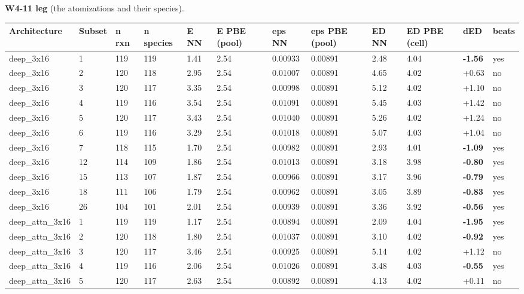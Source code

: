 \documentclass[10pt,a4paper]{article}
\begin{document}
\begin{landscape}
\textbf{W4-11 leg} (the atomizations and their species).

\begin{footnotesize}
\begin{longtable}{llllllllllll}
\toprule Architecture & Subset & n rxn & n species & E NN & E PBE (pool) & eps NN & eps PBE (pool) & ED NN & ED PBE (cell) & dED & beats \\ \midrule \endhead
deep\_3x16 & 1 & 119 & 119 & 1.41 & 2.54 & 0.00933 & 0.00891 & 2.48 & 4.04 & \textbf{-1.56} & yes \\
deep\_3x16 & 2 & 120 & 118 & 2.95 & 2.54 & 0.01007 & 0.00891 & 4.65 & 4.02 & +0.63 & no \\
deep\_3x16 & 3 & 120 & 117 & 3.35 & 2.54 & 0.00998 & 0.00891 & 5.12 & 4.02 & +1.10 & no \\
deep\_3x16 & 4 & 119 & 116 & 3.54 & 2.54 & 0.01091 & 0.00891 & 5.45 & 4.03 & +1.42 & no \\
deep\_3x16 & 5 & 120 & 117 & 3.43 & 2.54 & 0.01040 & 0.00891 & 5.26 & 4.02 & +1.24 & no \\
deep\_3x16 & 6 & 119 & 116 & 3.29 & 2.54 & 0.01018 & 0.00891 & 5.07 & 4.03 & +1.04 & no \\
deep\_3x16 & 7 & 118 & 115 & 1.70 & 2.54 & 0.00982 & 0.00891 & 2.93 & 4.01 & \textbf{-1.09} & yes \\
deep\_3x16 & 12 & 114 & 109 & 1.86 & 2.54 & 0.01013 & 0.00891 & 3.18 & 3.98 & \textbf{-0.80} & yes \\
deep\_3x16 & 15 & 113 & 107 & 1.87 & 2.54 & 0.00966 & 0.00891 & 3.17 & 3.96 & \textbf{-0.79} & yes \\
deep\_3x16 & 18 & 111 & 106 & 1.79 & 2.54 & 0.00962 & 0.00891 & 3.05 & 3.89 & \textbf{-0.83} & yes \\
deep\_3x16 & 26 & 104 & 101 & 2.01 & 2.54 & 0.00939 & 0.00891 & 3.36 & 3.92 & \textbf{-0.56} & yes \\
deep\_attn\_3x16 & 1 & 119 & 119 & 1.17 & 2.54 & 0.00894 & 0.00891 & 2.09 & 4.04 & \textbf{-1.95} & yes \\
deep\_attn\_3x16 & 2 & 120 & 118 & 1.80 & 2.54 & 0.01037 & 0.00891 & 3.10 & 4.02 & \textbf{-0.92} & yes \\
deep\_attn\_3x16 & 3 & 120 & 117 & 3.46 & 2.54 & 0.00925 & 0.00891 & 5.14 & 4.02 & +1.12 & no \\
deep\_attn\_3x16 & 4 & 119 & 116 & 2.06 & 2.54 & 0.01026 & 0.00891 & 3.48 & 4.03 & \textbf{-0.55} & yes \\
deep\_attn\_3x16 & 5 & 120 & 117 & 2.63 & 2.54 & 0.00892 & 0.00891 & 4.13 & 4.02 & +0.11 & no \\

\end{longtable}
\end{footnotesize}
\end{landscape}
\end{document}
